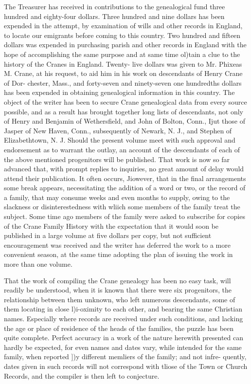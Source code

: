 \documentclass[oneside]{book}
\begin{document}
The Treasurer has received in contributions to the genealogical 
fund three hundred and eighty-four dollars. Three hundred and 
nine dollars has been expended in the attempt, by examination of 
wills and other records in England, to locate our emigrants before 
coming to this country. Two hundred and fifteen dollars was 
expended in purchasing parish and other records in England with 
the hope of accomplishing the same purpose and at same time 
ol)tain a clue to the history of the Cranes in England. Twenty- 
live dollars was given to Mr. Phixeas M. Crane, at his request, 
to aid him in his work on descendants of Henry Crane of Dor- 
chester, Mass., and forty-seven and ninety-seven one hundredths 
dollars has been expended in obtaining genealogical information 
in this country. The object of the writer has been to secure 
Crane genealogical data from every source possible, and as a 
result has brought together long lists of descendants, not only of 
Henry and Benjamin of Wethersfield, and John of Bolton, 
Conn., Ijut those of Jasper of New Haven, Conn., subsequently 
of Newark, N. J., and Stephen of Elizabethtown, N. J. Should 
the present volume meet with such approval and endorsement as 
to warrant the outlay, an account of the descendants of each of 
the above mentioned progenitors will be published. That work 
is now so far advanced that, with prompt replies to inquiries, no 
great amount of delay would attend their publication. It often 
occurs, Jiowever, that in the final arrangements some break 
appears, necessitating the addition of a word or two, or the 
record of a family, that may consume weeks and even months to 
supply, owing to the slackness or disinterestedness with wliich 
some members of the family treat the subject. Some time ago 
members of the family were asked to subscribe for copies of the 
Crane Family History with the expectation that it would soon 
be published in a large volume at five dollars per copy, but not 
sufficient encouragement was received and the writer has deferred 
the work to a more convenient season, at the same time adopting 
the plan of issuing the work in more than one volume. 

That the work of compiling the Crane genealogy has been no 
easy task, will readily be understood, when it is known that there 
were six progenitors, the relationship between them unknown, 
who left numerous descendants, some of them locating in close 
l)i-oximity to each other, and bearing the same Christian names. 
Especially where records are received under such conditions, and 
lacking the age or place of residence of the heads of the families, 
the puzzle has been quite complete. Perfect accuracy in a work 
of the nature herewith presented can hardly be expected, for even 
names and dates vary, while intended for the same family, when 
reported ])y different memliers of the family; and not infre- 
quently, dates given in such records will not correspond with 
tliose of the Town or Church Records, and the compiler is then 
left to conjecture. 
\end{document}
